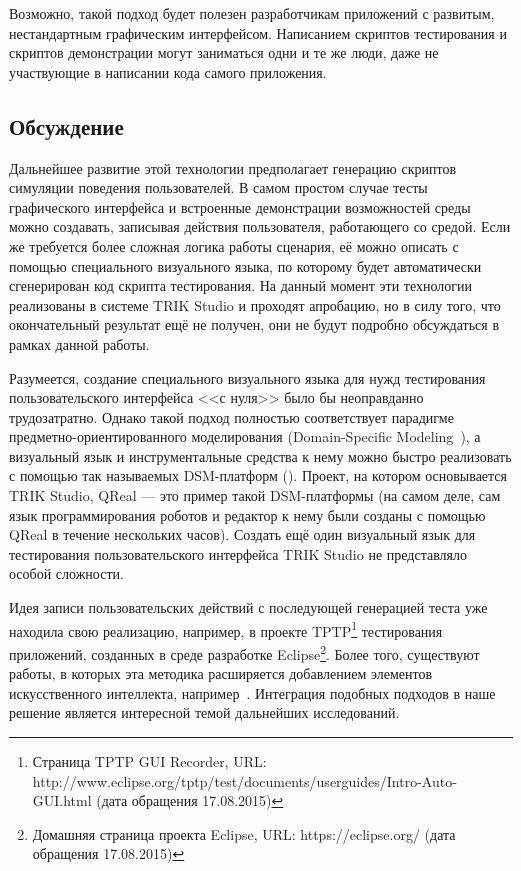 \documentclass[conference]{IEEEtran}
\begin{document}
Возможно, такой подход будет полезен разработчикам приложений с развитым, нестандартным графическим интерфейсом. 
Написанием скриптов тестирования и скриптов демонстрации могут заниматься одни и те же люди, даже не участвующие 
в написании кода самого приложения.

\subsection{Обсуждение}
Дальнейшее развитие этой технологии предполагает генерацию скриптов симуляции поведения пользователей. В самом 
простом случае тесты графического интерфейса и встроенные демонстрации возможностей среды можно создавать, 
записывая действия пользователя, работающего со средой. Если же требуется более сложная логика работы сценария, 
её можно описать с помощью специального визуального языка, по которому будет автоматически сгенерирован код 
скрипта тестирования. На данный момент эти технологии реализованы в системе TRIK Studio и проходят апробацию, 
но в силу того, что окончательный результат ещё не получен, они не будут подробно обсуждаться в рамках данной работы.

Разумеется, создание специального визуального языка для нужд тестирования пользовательского интерфейса <<с нуля>> 
было бы неоправданно трудозатратно. Однако такой подход полностью соответствует парадигме предметно-ориентированного 
моделирования (Domain-Specific Modeling~\cite{mernik2005and}), а визуальный язык и инструментальные средства 
к нему можно быстро реализовать с помощью так называемых DSM-платформ (\cite{pavlinov2006dsmtools, kelly2008domain}). 
Проект, на котором основывается TRIK Studio, QReal --- это пример такой DSM-платформы (на самом деле, 
сам язык программирования роботов и редактор к нему были созданы с помощью QReal в течение нескольких часов). 
Создать ещё один визуальный язык для тестирования пользовательского интерфейса TRIK Studio не представляло особой сложности.

Идея записи пользовательских действий с последующей генерацией теста уже находила свою реализацию, например, 
в проекте TPTP\footnote{Страница TPTP GUI Recorder, URL: http://www.eclipse.org/tptp/test/documents/userguides/Intro-Auto-GUI.html (дата обращения 17.08.2015)} 
тестирования приложений, созданных в среде разработке Eclipse\footnote{Домашняя страница проекта Eclipse, URL: https://eclipse.org/ (дата обращения 17.08.2015)}. 
Более того, существуют работы, в которых эта методика расширяется добавлением элементов искусственного 
интеллекта, например~\cite{memon2001hierarchical, sugiura1996simplifying}. Интеграция подобных подходов в наше решение 
является интересной темой дальнейших исследований.
\end{document}
